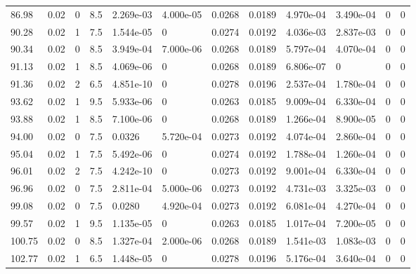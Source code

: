 \documentclass[preview]{standalone}
\begin{document}
{{{\begin{tabular}{L{1.2cm}C{1.2cm} C{0.3cm}C{0.5cm} C{1.4cm}C{1.4cm} C{1.4cm}C{1.4cm} C{1.6cm}C{1.6cm} C{1.6cm}C{1.6cm}}
  86.98  &  0.02  & 0     & 8.5 &  2.269e-03  & 4.000e-05  &  0.0268&   0.0189& 4.970e-04 & 3.490e-04   &  0 & 0  \\ 
  90.28  &  0.02  & 1     & 7.5 &  1.544e-05  & 0  &  0.0274&   0.0192& 4.036e-03 & 2.837e-03   &  0 & 0  \\ 
  90.34  &  0.02  & 0     & 8.5 &  3.949e-04  & 7.000e-06  &  0.0268&   0.0189& 5.797e-04 & 4.070e-04   &  0 & 0  \\ 
  91.13  &  0.02  & 1     & 8.5 &  4.069e-06  & 0  &  0.0268&   0.0189& 6.806e-07 & 0   &  0 & 0  \\ 
  91.36  &  0.02  & 2     & 6.5 &  4.851e-10  & 0  &  0.0278&   0.0196& 2.537e-04 & 1.780e-04   &  0 & 0  \\ 
  93.62  &  0.02  & 1     & 9.5 &  5.933e-06  & 0  &  0.0263&   0.0185& 9.009e-04 & 6.330e-04   &  0 & 0  \\ 
  93.88  &  0.02  & 1     & 8.5 &  7.100e-06  & 0  &  0.0268&   0.0189& 1.266e-04 & 8.900e-05   &  0 & 0  \\ 
  94.00  &  0.02  & 0     & 7.5 &  0.0326  & 5.720e-04  &  0.0273&   0.0192& 4.074e-04 & 2.860e-04   &  0 & 0  \\ 
  95.04  &  0.02  & 1     & 7.5 &  5.492e-06  & 0  &  0.0274&   0.0192& 1.788e-04 & 1.260e-04   &  0 & 0  \\ 
  96.01  &  0.02  & 2     & 7.5 &  4.242e-10  & 0  &  0.0273&   0.0192& 9.001e-04 & 6.330e-04   &  0 & 0  \\ 
  96.96  &  0.02  & 0     & 7.5 &  2.811e-04  & 5.000e-06  &  0.0273&   0.0192& 4.731e-03 & 3.325e-03   &  0 & 0  \\ 
  99.08  &  0.02  & 0     & 7.5 &  0.0280  & 4.920e-04  &  0.0273&   0.0192& 6.081e-04 & 4.270e-04   &  0 & 0  \\ 
  99.57  &  0.02  & 1     & 9.5 &  1.135e-05  & 0  &  0.0263&   0.0185& 1.017e-04 & 7.200e-05   &  0 & 0  \\ 
  100.75  &  0.02  & 0     & 8.5 &  1.327e-04  & 2.000e-06  &  0.0268&   0.0189& 1.541e-03 & 1.083e-03   &  0 & 0  \\ 
  102.77  &  0.02  & 1     & 6.5 &  1.448e-05  & 0  &  0.0278&   0.0196& 5.176e-04 & 3.640e-04   &  0 & 0  \\ 
\hline 
\end{tabular} 

}}}
\end{document}
